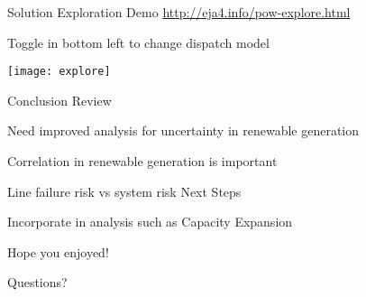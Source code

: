 \begin{frame}{Solution Exploration Demo}
\url{http://eja4.info/pow-explore.html}
\bi
\item Toggle in bottom left to change dispatch model
\ei
\begin{center}
\texttt{[image: explore]}
\end{center}
\end{frame}

\begin{frame}{Conclusion}
Review
\bi
\item Need improved analysis for uncertainty in renewable generation
\item Correlation in renewable generation is important
\item Line failure risk vs system risk
\ei
Next Steps
\bi
\item Incorporate in analysis such as Capacity Expansion
\ei

\pause

\vspace{0.2cm}
Hope you enjoyed!

Questions?
\EBR
\end{frame}


